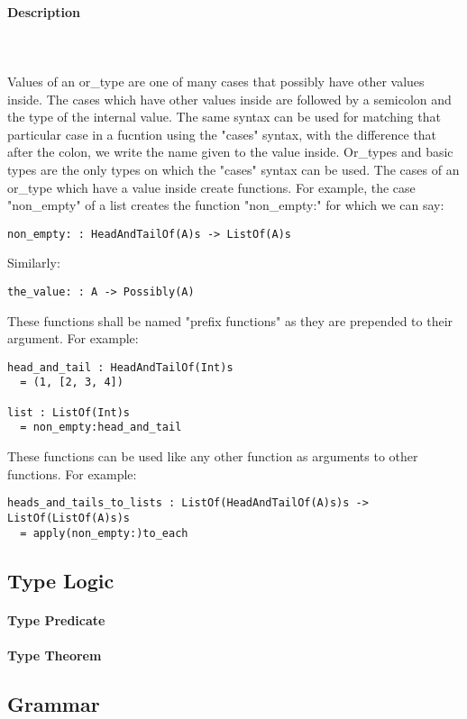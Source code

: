 \documentclass{article}
\def\pend{\mbox{} \\\\}
\begin{document}
\paragraph{Description}\pend
Values of an or\_type are one of many cases that possibly have other values inside.
The cases which have other values inside are followed by a semicolon and the 
type of the internal value. The same syntax can be used for matching that particular 
case in a fucntion using the "cases" syntax, with the difference that after the
colon, we write the name given to the value inside. 
Or\_types and basic types are the only types on which
the "cases" syntax can be used. The cases of an or\_type which have a value
inside create functions. For example, the case "non\_empty" of a list creates the
function "non\_empty:" for which we can say:
\begin{verbatim}
non_empty: : HeadAndTailOf(A)s -> ListOf(A)s
\end{verbatim}
Similarly:
\begin{verbatim}
the_value: : A -> Possibly(A)
\end{verbatim}
These functions shall be named "prefix functions" as they are prepended to their
argument.
For example:
\begin{verbatim}
head_and_tail : HeadAndTailOf(Int)s
  = (1, [2, 3, 4])

list : ListOf(Int)s
  = non_empty:head_and_tail
\end{verbatim}
These functions can be used like any other function as arguments to other functions.
For example:
\begin{verbatim}
heads_and_tails_to_lists : ListOf(HeadAndTailOf(A)s)s -> ListOf(ListOf(A)s)s
  = apply(non_empty:)to_each
\end{verbatim}

\subsection{Type Logic}

\paragraph{Type Predicate}

\paragraph{Type Theorem}

\subsection{Grammar}
\end{document}
